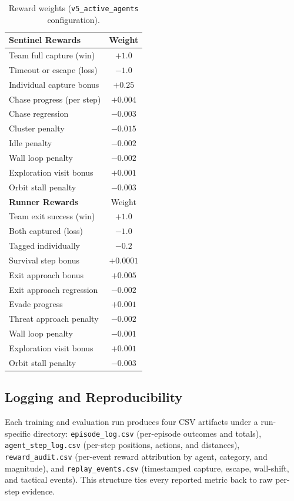 \documentclass[conference]{IEEEtran}
\begin{document}
\begin{table}[t]
\centering
\caption{Reward weights (\texttt{v5\_active\_agents} configuration).}
\label{tab:rewards}
\begin{tabular}{lc}
\toprule
\textbf{Sentinel Rewards} & Weight \\
\midrule
Team full capture (win) & $+1.0$ \\
Timeout or escape (loss) & $-1.0$ \\
Individual capture bonus & $+0.25$ \\
Chase progress (per step) & $+0.004$ \\
Chase regression & $-0.003$ \\
Cluster penalty & $-0.015$ \\
Idle penalty & $-0.002$ \\
Wall loop penalty & $-0.002$ \\
Exploration visit bonus & $+0.001$ \\
Orbit stall penalty & $-0.003$ \\
\midrule
\textbf{Runner Rewards} & Weight \\
\midrule
Team exit success (win) & $+1.0$ \\
Both captured (loss) & $-1.0$ \\
Tagged individually & $-0.2$ \\
Survival step bonus & $+0.0001$ \\
Exit approach bonus & $+0.005$ \\
Exit approach regression & $-0.002$ \\
Evade progress & $+0.001$ \\
Threat approach penalty & $-0.002$ \\
Wall loop penalty & $-0.001$ \\
Exploration visit bonus & $+0.001$ \\
Orbit stall penalty & $-0.003$ \\
\bottomrule
\end{tabular}
\end{table}

\subsection{Logging and Reproducibility}

Each training and evaluation run produces four CSV artifacts under a run-specific directory: \texttt{episode\_log.csv} (per-episode outcomes and totals), \texttt{agent\_step\_log.csv} (per-step positions, actions, and distances), \texttt{reward\_audit.csv} (per-event reward attribution by agent, category, and magnitude), and \texttt{replay\_events.csv} (timestamped capture, escape, wall-shift, and tactical events). This structure ties every reported metric back to raw per-step evidence.
\end{document}
